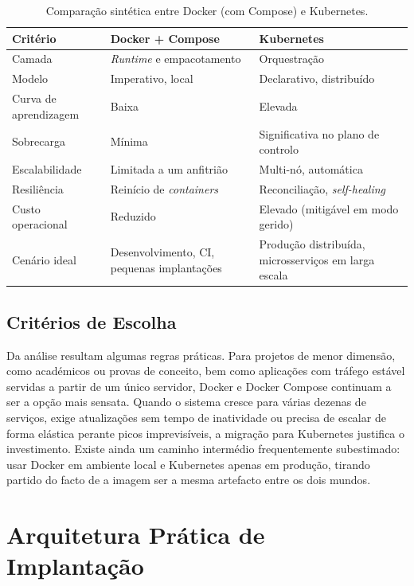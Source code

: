 \documentclass[conference]{IEEEtran}
\begin{document}
\begin{table}[t]
\caption{Comparação sintética entre Docker (com Compose) e Kubernetes.}
\label{tab:comp}
\centering
\renewcommand{\arraystretch}{1.15}
\footnotesize
\begin{tabular}{@{}p{2.1cm}p{2.5cm}p{2.6cm}@{}}
\toprule
\textbf{Critério} & \textbf{Docker + Compose} & \textbf{Kubernetes} \\
\midrule
Camada & \textit{Runtime} e empacotamento & Orquestração \\
Modelo & Imperativo, local & Declarativo, distribuído \\
Curva de aprendizagem & Baixa & Elevada \\
Sobrecarga & Mínima & Significativa no plano de controlo \\
Escalabilidade & Limitada a um anfitrião & Multi-nó, automática \\
Resiliência & Reinício de \textit{containers} & Reconciliação, \textit{self-healing} \\
Custo operacional & Reduzido & Elevado (mitigável em modo gerido) \\
Cenário ideal & Desenvolvimento, CI, pequenas implantações & Produção distribuída, microsserviços em larga escala \\
\bottomrule
\end{tabular}
\end{table}

\subsection{Critérios de Escolha}
Da análise resultam algumas regras práticas. Para projetos de menor dimensão, como académicos ou provas de conceito, bem como aplicações com tráfego estável servidas a partir de um único servidor, Docker e Docker Compose continuam a ser a opção mais sensata. Quando o sistema cresce para várias dezenas de serviços, exige atualizações sem tempo de inatividade ou precisa de escalar de forma elástica perante picos imprevisíveis, a migração para Kubernetes justifica o investimento. Existe ainda um caminho intermédio frequentemente subestimado: usar Docker em ambiente local e Kubernetes apenas em produção, tirando partido do facto de a imagem ser a mesma artefacto entre os dois mundos.

\section{Arquitetura Prática de Implantação}
\end{document}
